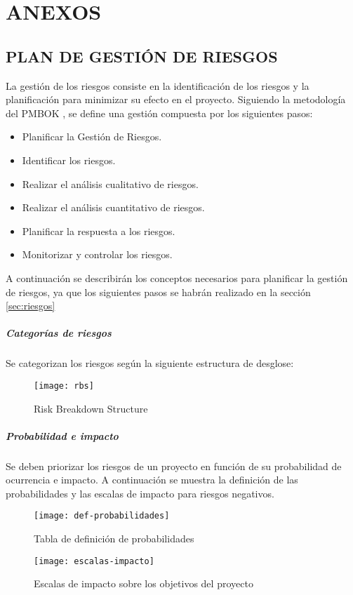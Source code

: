 \newpage
\chapter{ANEXOS}
\newpage
\section{PLAN DE GESTIÓN DE RIESGOS}\label{sec:plan-riesgos}
La gestión de los riesgos consiste en la identificación de los riesgos y la planificación para minimizar su efecto en el proyecto. Siguiendo la metodología del PMBOK \cite{PMBOK}, se define una gestión compuesta por los siguientes pasos:
\begin{itemize}
\item Planificar la Gestión de Riesgos.
\item Identificar los riesgos.
\item Realizar el análisis cualitativo de riesgos.
\item Realizar el análisis cuantitativo de riesgos.
\item Planificar la respuesta a los riesgos.
\item Monitorizar y controlar los riesgos.
\end{itemize}
A continuación se describirán los conceptos necesarios para planificar la gestión de riesgos, ya que los siguientes pasos se habrán realizado en la sección \ref{sec:riesgos}
\paragraph*{Categorías de riesgos}
Se categorizan los riesgos según la siguiente estructura de desglose:
\begin{figure}[H]
\centering
\centerline{\texttt{[image: rbs]}}
\caption{Risk Breakdown Structure}
\end{figure}

\paragraph*{Probabilidad e impacto}
Se deben priorizar los riesgos de un proyecto en función de su probabilidad de ocurrencia e impacto. A continuación se muestra la definición de las probabilidades y las escalas de impacto para riesgos negativos.
\begin{figure}[H]
\centering
\centerline{\texttt{[image: def-probabilidades]}}
\caption{Tabla de definición de probabilidades}
\end{figure}
\begin{figure}[H]
\centering
\centerline{\texttt{[image: escalas-impacto]}}
\caption{Escalas de impacto sobre los objetivos del proyecto}
\end{figure}

